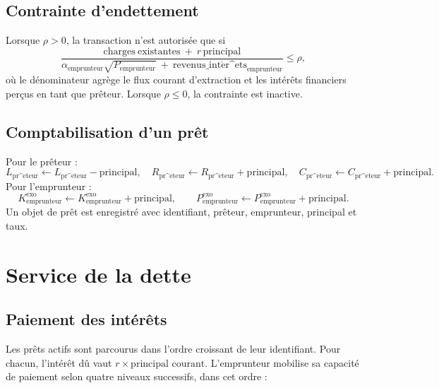 \documentclass[11pt,a4paper]{article}
\begin{document}
\subsection{Contrainte d'endettement}

Lorsque \(\rho>0\), la transaction n'est autorisée que si
\[
\frac{\mathrm{charges\ existantes}\ +\ r\,\mathrm{principal}}
{\alpha_{\mathrm{emprunteur}}\sqrt{P_{\mathrm{emprunteur}}}\ +\ \mathrm{revenus\_int\acute er\^ets}_{\mathrm{emprunteur}}}
\le \rho,
\]
où le dénominateur agrège le flux courant d'extraction et les intérêts financiers perçus en tant que prêteur. Lorsque \(\rho\le 0\), la contrainte est inactive.

\subsection{Comptabilisation d'un prêt}

Pour le prêteur :
\[
L_{\mathrm{pr\^eteur}} \leftarrow L_{\mathrm{pr\^eteur}} - \mathrm{principal},\quad
R_{\mathrm{pr\^eteur}} \leftarrow R_{\mathrm{pr\^eteur}} + \mathrm{principal},\quad
C_{\mathrm{pr\^eteur}} \leftarrow C_{\mathrm{pr\^eteur}} + \mathrm{principal}.
\]
Pour l'emprunteur :
\[
K_{\mathrm{emprunteur}}^{\mathrm{exo}} \leftarrow K_{\mathrm{emprunteur}}^{\mathrm{exo}} + \mathrm{principal},\qquad
P_{\mathrm{emprunteur}}^{\mathrm{exo}} \leftarrow P_{\mathrm{emprunteur}}^{\mathrm{exo}} + \mathrm{principal}.
\]
Un objet de prêt est enregistré avec identifiant, prêteur, emprunteur, principal et taux.

\section{Service de la dette}

\subsection{Paiement des intérêts}

Les prêts actifs sont parcourus dans l'ordre croissant de leur identifiant. Pour chacun, l'intérêt dû vaut \(r\times\text{principal courant}\). L'emprunteur mobilise sa capacité de paiement selon quatre niveaux successifs, dans cet ordre :
\end{document}
